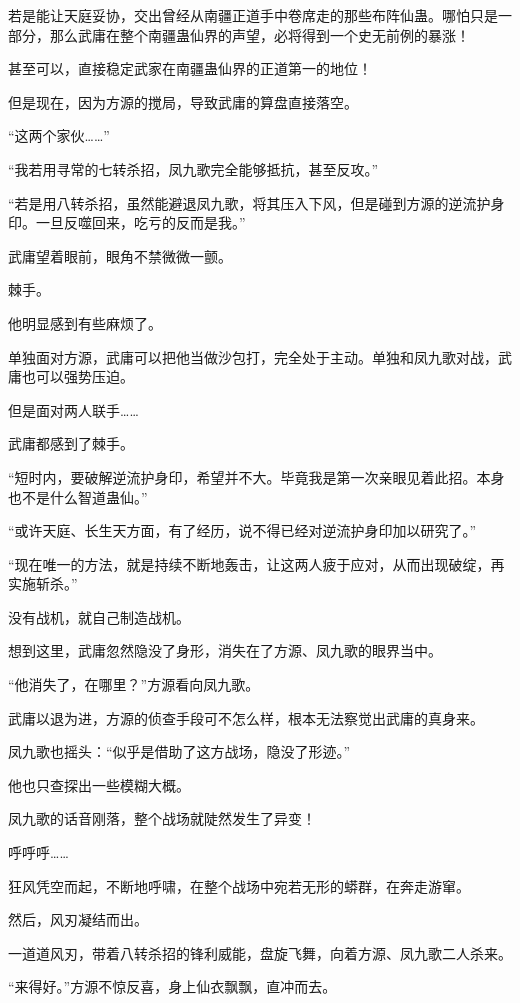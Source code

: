 \begin{this_body}
若是能让天庭妥协，交出曾经从南疆正道手中卷席走的那些布阵仙蛊。哪怕只是一部分，那么武庸在整个南疆蛊仙界的声望，必将得到一个史无前例的暴涨！

甚至可以，直接稳定武家在南疆蛊仙界的正道第一的地位！

但是现在，因为方源的搅局，导致武庸的算盘直接落空。

“这两个家伙……”

“我若用寻常的七转杀招，凤九歌完全能够抵抗，甚至反攻。”

“若是用八转杀招，虽然能避退凤九歌，将其压入下风，但是碰到方源的逆流护身印。一旦反噬回来，吃亏的反而是我。”

武庸望着眼前，眼角不禁微微一颤。

棘手。

他明显感到有些麻烦了。

单独面对方源，武庸可以把他当做沙包打，完全处于主动。单独和凤九歌对战，武庸也可以强势压迫。

但是面对两人联手……

武庸都感到了棘手。

“短时内，要破解逆流护身印，希望并不大。毕竟我是第一次亲眼见着此招。本身也不是什么智道蛊仙。”

“或许天庭、长生天方面，有了经历，说不得已经对逆流护身印加以研究了。”

“现在唯一的方法，就是持续不断地轰击，让这两人疲于应对，从而出现破绽，再实施斩杀。”

没有战机，就自己制造战机。

想到这里，武庸忽然隐没了身形，消失在了方源、凤九歌的眼界当中。

“他消失了，在哪里？”方源看向凤九歌。

武庸以退为进，方源的侦查手段可不怎么样，根本无法察觉出武庸的真身来。

凤九歌也摇头：“似乎是借助了这方战场，隐没了形迹。”

他也只查探出一些模糊大概。

凤九歌的话音刚落，整个战场就陡然发生了异变！

呼呼呼……

狂风凭空而起，不断地呼啸，在整个战场中宛若无形的蟒群，在奔走游窜。

然后，风刃凝结而出。

一道道风刃，带着八转杀招的锋利威能，盘旋飞舞，向着方源、凤九歌二人杀来。

“来得好。”方源不惊反喜，身上仙衣飘飘，直冲而去。


\end{this_body}
